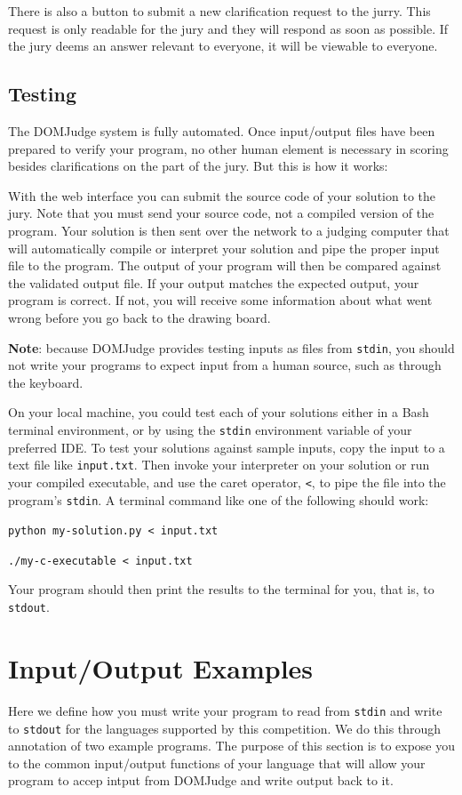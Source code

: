 \documentclass[a4paper]{article}
\begin{document}
There is also a button to submit a new clarification request to the jurry. This request is only readable for the jury and they will respond as soon as possible. If the jury deems an answer relevant to everyone, it will be viewable to everyone. 

\subsection{Testing}
The DOMJudge system is fully automated. Once input/output files have been prepared to verify your program, no other human element is necessary in scoring besides clarifications on the part of the jury. But this is how it works:

With the web interface you can submit the source code of your solution to the jury. Note that you must send your source code, not a compiled version of the program. Your solution is then sent over the network to a judging computer that will automatically compile or interpret your solution and pipe the proper input file to the program. The output of your program will then be compared against the validated output file. If your output matches the expected output, your program is correct. If not, you will receive some information about what went wrong before you go back to the drawing board.

\textbf{Note}: because DOMJudge provides testing inputs as files from \texttt{stdin}, you should not write your programs to expect input from a human source, such as through the keyboard.

On your local machine, you could test each of your solutions either in a Bash terminal environment, or by using the \texttt{stdin} environment variable of your preferred IDE. To test your solutions against sample inputs, copy the input to a text file like \texttt{input.txt}. Then invoke your interpreter on your solution or run your compiled executable, and use the caret operator, \texttt{<}, to pipe the file into the program's \texttt{stdin}. A terminal command like one of the following should work:

\texttt{python my-solution.py < input.txt}

\texttt{./my-c-executable < input.txt}

Your program should then print the results to the terminal for you, that is, to \texttt{stdout}.

\section{Input/Output Examples}
Here we define how you must write your program to read from \texttt{stdin} and write to \texttt{stdout} for the languages supported by this competition. We do this through annotation of two example programs. The purpose of this section is to expose you to the common input/output functions of your language that will allow your program to accep intput from DOMJudge and write output back to it.
\newpage
\end{document}
